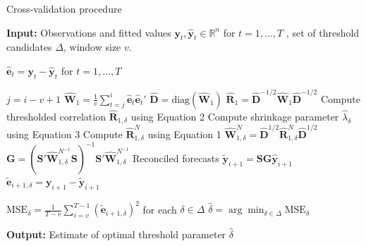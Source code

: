 \documentclass[
  11pt,
  letterpaper,
  DIV=11,
  numbers=noendperiod,
  titlepage]{scrartcl}
\begin{document}
\begin{algorithm}[H]
\caption{Cross-validation procedure}\label{alg:novelist_cv}
\begin{algorithmic}[1]

\State \textbf{Input:} Observations and fitted values $\boldsymbol{y}_t, \hat{\boldsymbol{y}}_t \in \mathbb{R}^n$ for $t = 1,\dots,T$ \footnotemark, set of threshold candidates $\Delta$, window size $v$.

\State $\hat{\boldsymbol{e}}_t = \boldsymbol{y}_t - \hat{\boldsymbol{y}}_t$ for $t = 1,\dots,T$

    \State $j = i - v +1$
    \State $\hat{\boldsymbol{W}}_1 = \frac{1}{v} \sum_{t=j}^{i} \hat{\boldsymbol{e}}_{t} \hat{\boldsymbol{e}}_{t}'$
    \State $\hat{\boldsymbol{D}} = \text{diag}(\hat{\boldsymbol{W}}_1)$
    \State $\hat{\boldsymbol{R}}_1 = \hat{\boldsymbol{D}}^{-1/2} \hat{\boldsymbol{W}}_1 \hat{\boldsymbol{D}}^{-1/2}$
    \For{$\delta \in \Delta$}
        \State Compute thresholded correlation $\hat{\boldsymbol{R}}_{1,\delta}$ using Equation 2
        \State Compute shrinkage parameter $\hat{\lambda}_{\delta}$ using Equation 3
        \State Compute $\hat{\boldsymbol{R}}^{N}_{1,\delta}$ using Equation 1
        \State $\hat{\boldsymbol{W}}^{N}_{1,\delta} = \hat{\boldsymbol{D}}^{1/2} \hat{\boldsymbol{R}}^{N}_{1,\delta} \hat{\boldsymbol{D}}^{1/2}$
        \State $\boldsymbol{G} = (\boldsymbol{S}' \hat{\boldsymbol{W}}^{N^{-1}}_{1,\delta} \boldsymbol{S})^{-1} \boldsymbol{S}' \hat{\boldsymbol{W}}^{N^{-1}}_{1,\delta}$
        \State Reconciled forecasts $\tilde{\boldsymbol{y}}_{i+1} = \boldsymbol{S} \boldsymbol{G} \hat{\boldsymbol{y}}_{i+1}$
        \State $\tilde{\boldsymbol{e}}_{i+1, \delta} = \boldsymbol{y}_{i+1} - \tilde{\boldsymbol{y}}_{i+1}$
    \EndFor
\EndFor

\State $\text{MSE}_{\delta} = \frac{1}{T-v} \sum_{i=v}^{T-1} (\tilde{\boldsymbol{e}}_{i+1, \delta})^2$ for each $\delta \in \Delta$
\State $\hat{\delta} = \arg\min_{\delta \in \Delta} \text{MSE}_{\delta}$

\State \textbf{Output:} Estimate of optimal threshold parameter $\hat{\delta}$

\end{algorithmic}
\end{algorithm}

\end{document}
